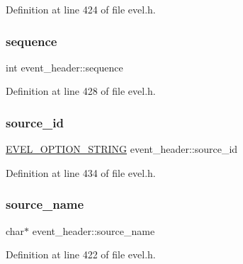 Definition at line 424 of file evel.\+h.

\hypertarget{structevent__header_a3640c2b0a997500273b6db73f050ff10}{}\label{structevent__header_a3640c2b0a997500273b6db73f050ff10} 
\subsubsection{\texorpdfstring{sequence}{sequence}}
{\footnotesize\ttfamily int event\+\_\+header\+::sequence}



Definition at line 428 of file evel.\+h.

\hypertarget{structevent__header_ab35fa935cb5c5850b400fb64f648025b}{}\label{structevent__header_ab35fa935cb5c5850b400fb64f648025b} 
\subsubsection{\texorpdfstring{source\+\_\+id}{source\_id}}
{\footnotesize\ttfamily \hyperlink{evel_8h_a0de5113a7b72de93c0c7b644f7ea7ec3}{E\+V\+E\+L\+\_\+\+O\+P\+T\+I\+O\+N\+\_\+\+S\+T\+R\+I\+NG} event\+\_\+header\+::source\+\_\+id}



Definition at line 434 of file evel.\+h.

\hypertarget{structevent__header_a5619697d328950141c426df951988f94}{}\label{structevent__header_a5619697d328950141c426df951988f94} 
\subsubsection{\texorpdfstring{source\+\_\+name}{source\_name}}
{\footnotesize\ttfamily char$\ast$ event\+\_\+header\+::source\+\_\+name}



Definition at line 422 of file evel.\+h.

\hypertarget{structevent__header_af1abe603869530794daf1f4969c6b50c}{}\label{structevent__header_af1abe603869530794daf1f4969c6b50c} 
